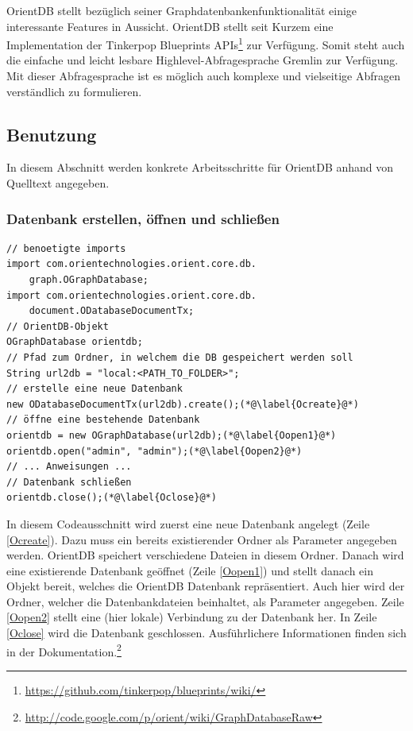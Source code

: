 \documentclass[11pt, a4paper, oneside]{article} %
\begin{document}
OrientDB stellt bezüglich seiner Graphdatenbankenfunktionalität einige interessante Features in Aussicht. OrientDB stellt seit Kurzem eine Implementation der Tinkerpop Blueprints APIs\footnote{\url{https://github.com/tinkerpop/blueprints/wiki/}} zur Verfügung. Somit steht auch die einfache und leicht lesbare Highlevel-Abfragesprache Gremlin zur Verfügung. Mit dieser Abfragesprache ist es möglich auch komplexe und vielseitige Abfragen verständlich zu formulieren.

\subsection{Benutzung}

In diesem Abschnitt werden konkrete Arbeitsschritte für OrientDB anhand von Quelltext angegeben.

\subsubsection{Datenbank erstellen, öffnen und schließen}
\begin{lstlisting}[caption={OrientDB - Datenbank erstellen, öffnen und schließen}]
// benoetigte imports
import com.orientechnologies.orient.core.db.
	graph.OGraphDatabase;
import com.orientechnologies.orient.core.db.
	document.ODatabaseDocumentTx;
// OrientDB-Objekt
OGraphDatabase orientdb;
// Pfad zum Ordner, in welchem die DB gespeichert werden soll
String url2db = "local:<PATH_TO_FOLDER>";
// erstelle eine neue Datenbank
new ODatabaseDocumentTx(url2db).create();(*@\label{Ocreate}@*)
// öffne eine bestehende Datenbank
orientdb = new OGraphDatabase(url2db);(*@\label{Oopen1}@*)
orientdb.open("admin", "admin");(*@\label{Oopen2}@*)
// ... Anweisungen ...
// Datenbank schließen
orientdb.close();(*@\label{Oclose}@*)
\end{lstlisting}

In diesem Codeausschnitt wird zuerst eine neue Datenbank angelegt (Zeile \ref{Ocreate}). Dazu muss ein bereits existierender Ordner als Parameter angegeben werden. OrientDB speichert verschiedene Dateien in diesem Ordner. Danach wird eine existierende Datenbank geöffnet (Zeile \ref{Oopen1}) und stellt danach ein Objekt bereit, welches die OrientDB Datenbank repräsentiert. Auch hier wird der Ordner, welcher die Datenbankdateien beinhaltet, als Parameter angegeben. Zeile \ref{Oopen2} stellt eine (hier lokale) Verbindung zu der Datenbank her. In Zeile \ref{Oclose} wird die Datenbank geschlossen.
Ausführlichere Informationen finden sich in der Dokumentation.\footnote{\url{http://code.google.com/p/orient/wiki/GraphDatabaseRaw}}
\end{document}

